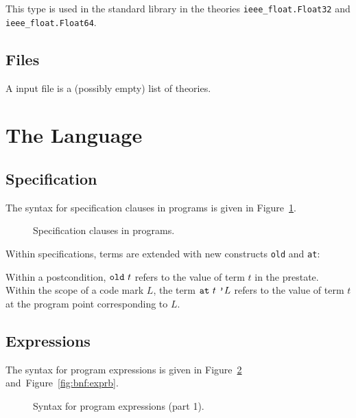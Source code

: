 This type is used in the standard library in the theories
\texttt{ieee\_float.Float32} and \texttt{ieee\_float.Float64}.

\subsection{Files}

A \why input file is a (possibly empty) list of theories.
\begin{center}\framebox{}\end{center}


\clearpage
\section{The \whyml Language}\label{sec:syntax:whyml}

\subsection{Specification}

The syntax for specification clauses in programs
is given in Figure~\ref{fig:bnf:spec}.
\begin{figure}
  \begin{center}\framebox{}\end{center}
  \caption{Specification clauses in programs.}
\label{fig:bnf:spec}
\end{figure}
Within specifications, terms are extended with new constructs
\verb|old| and \verb|at|:
\begin{center}\framebox{}\end{center}
Within a postcondition, $\verb|old|~t$ refers to the value of term $t$
in the prestate. Within the scope of a code mark $L$,
the term $\verb|at|~t~\verb|'|L$ refers to the value of term $t$ at the program
point corresponding to $L$.

\subsection{Expressions}

The syntax for program expressions is given in
Figure~\ref{fig:bnf:expra} and~Figure~\ref{fig:bnf:exprb}.
\begin{figure}
  \begin{center}\framebox{}\end{center}
  \caption{Syntax for program expressions (part 1).}
\label{fig:bnf:expra}
\end{figure}

